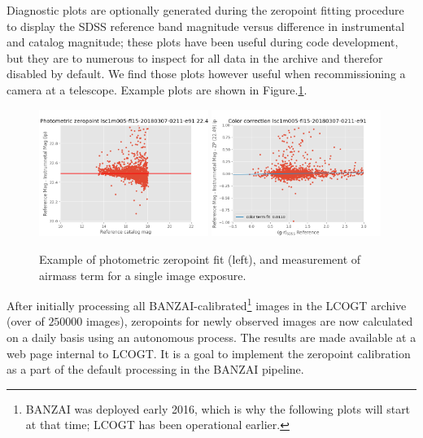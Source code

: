 \documentclass[]{spieman}
\begin{document}
Diagnostic plots are optionally generated during the zeropoint fitting procedure to display the
SDSS reference band magnitude versus difference in instrumental and catalog magnitude; these plots
have been useful during code development, but they are to numerous to inspect for all data in the
archive and therefor disabled by default. We find those plots however useful when recommissioning a
camera at a telescope. Example plots are shown in Figure.\ref{fig_singleimageexample}.


\begin{figure}
\centering
\includegraphics[width=0.49\textwidth]{images/example_zeropointfit.png} \hspace*{\fill}
\includegraphics[width=0.49\textwidth]{images/example_colortermfit.png} \\[1ex]
\caption{\label{fig_singleimageexample}Example of photometric zeropoint fit (left), and measurement of
airmass term for a single image exposure.}
\end{figure}

After initially processing all BANZAI-calibrated\footnote{BANZAI was deployed early 2016, which 
is why the following plots will start at that time; LCOGT has been operational earlier.} images 
in the LCOGT archive (over of $250000$ images), zeropoints for newly observed  images are now 
calculated on a daily basis using an autonomous process. The results  
are made available at a web page internal to LCOGT. It is a goal to implement the zeropoint 
calibration as a part of the default processing in the BANZAI pipeline.
\end{document}
